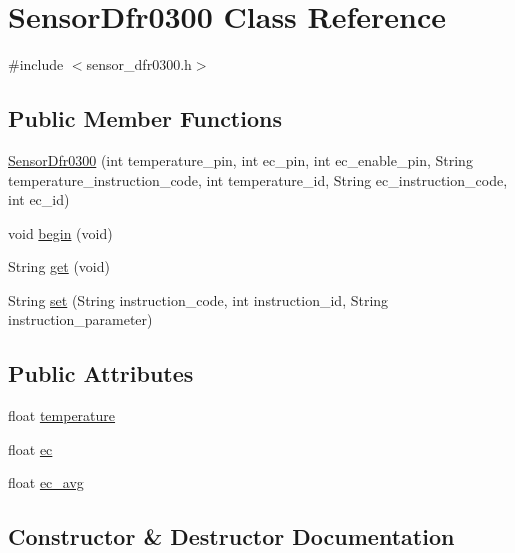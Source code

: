\hypertarget{class_sensor_dfr0300}{}\section{Sensor\+Dfr0300 Class Reference}
\label{class_sensor_dfr0300}


{\ttfamily \#include $<$sensor\+\_\+dfr0300.\+h$>$}

\subsection*{Public Member Functions}
\begin{DoxyCompactItemize}
\item 
\hyperlink{class_sensor_dfr0300_a8a318afa69fd7aeb2c5d331bf3cc196a}{Sensor\+Dfr0300} (int temperature\+\_\+pin, int ec\+\_\+pin, int ec\+\_\+enable\+\_\+pin, String temperature\+\_\+instruction\+\_\+code, int temperature\+\_\+id, String ec\+\_\+instruction\+\_\+code, int ec\+\_\+id)
\item 
void \hyperlink{class_sensor_dfr0300_a310bf946e482b58ab079d43f3bb3093b}{begin} (void)
\item 
String \hyperlink{class_sensor_dfr0300_a16b2e1ab7ed6bd191ea3a4d588d28861}{get} (void)
\item 
String \hyperlink{class_sensor_dfr0300_a538a5bd7f86693ce975d4b4b7f48bee0}{set} (String instruction\+\_\+code, int instruction\+\_\+id, String instruction\+\_\+parameter)
\end{DoxyCompactItemize}
\subsection*{Public Attributes}
\begin{DoxyCompactItemize}
\item 
float \hyperlink{class_sensor_dfr0300_acc4191cfd71800c3aa571bcb1820b385}{temperature}
\item 
float \hyperlink{class_sensor_dfr0300_abe5609d68642bb1f9e898820dd742671}{ec}
\item 
float \hyperlink{class_sensor_dfr0300_a110d741893fd0fca0145325b3ffa8300}{ec\+\_\+avg}
\end{DoxyCompactItemize}


\subsection{Constructor \& Destructor Documentation}
\hypertarget{class_sensor_dfr0300_a8a318afa69fd7aeb2c5d331bf3cc196a}{}
